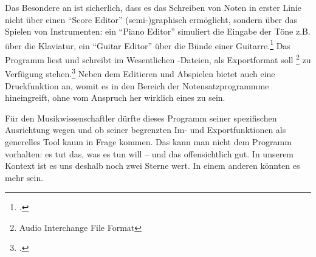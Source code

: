 Das Besondere an  ist sicherlich, dass es das Schreiben von
Noten in erster Linie nicht über einen \enquote{Score Editor} (semi-)graphisch
ermöglicht, sondern über das Spielen von Instrumenten: ein \enquote{Piano Editor}
simuliert die Eingabe der Töne z.B. über die Klaviatur, ein \enquote{Guitar
Editor} über die Bünde einer Guitarre.\footcite[vgl.][\nopage
wp]{AriaMaestosa2017b} Das Programm liest und schreibt im Wesentlichen
-Dateien, als Exportformat soll \footnote{Audio Interchange
File Format} zu Verfügung stehen.\footcite[vgl.][\nopage wp]{Guepewi2017a} Neben
dem Editieren und Abspielen bietet  auch eine
Druckfunktion an, womit es in den Bereich der Notensatzprogrammme hineingreift,
ohne vom Anspruch her wirklich eines zu sein.

Für den Musikwissenschaftler dürfte dieses Programm seiner spezifischen
Ausrichtung wegen und ob seiner begrenzten Im- und Exportfunktionen als generelles
Tool kaum in Frage kommen. Das kann man nicht dem Programm vorhalten: es
tut das, was es tun will -- und das offensichtlich gut. In unserem Kontext ist
es uns deshalb noch zwei Sterne wert. In einem anderen könnten es mehr sein.

% 
